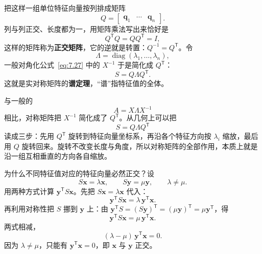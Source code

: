 \documentclass[UTF8,a4paper,12pt]{ctexart}
\numberwithin{equation}{section}
\newcommand{\trans}{^{\mathsf T}}
\begin{document}
	把这样一组单位特征向量按列排成矩阵
	\begin{equation}\label{eq:7.57}
	Q=
	\begin{bmatrix}
		\bm{q}_1&\cdots&\bm{q}_n
	\end{bmatrix}.
	\end{equation}
	列与列正交、长度都为一，用矩阵乘法写出来恰好是
	\begin{equation}\label{eq:7.58}
	Q\trans Q=QQ\trans=I,
	\end{equation}
	这样的矩阵称为\textbf{正交矩阵}，它的逆就是转置：$Q^{-1}=Q\trans$。令
	\begin{equation}\label{eq:7.59}
	\Lambda=\operatorname{diag}(\lambda_1,\ldots,\lambda_n),
	\end{equation}
一般对角化公式~\eqref{eq:7.27} 中的 $X^{-1}$ 于是简化成 $Q\trans$：
	\begin{equation}\label{eq:7.60}
	\boxed{S=Q\Lambda Q\trans.}
	\end{equation}
	这就是实对称矩阵的\textbf{谱定理}，“谱”指特征值的全体。

	与一般的
	\begin{equation}\label{eq:7.61}
	A=X\Lambda X^{-1}
	\end{equation}
	相比，对称矩阵把 $X^{-1}$ 简化成了 $Q\trans$。从几何上可以把
	\begin{equation}\label{eq:7.62}
	S=Q\Lambda Q\trans
	\end{equation}
	读成三步：先用 $Q\trans$ 旋转到特征向量坐标系，再沿各个特征方向按 $\lambda_i$ 缩放，最后用 $Q$ 旋转回来。旋转不改变长度与角度，所以对称矩阵的全部作用，本质上就是沿一组互相垂直的方向各自缩放。

	为什么不同特征值对应的特征向量必然正交？设
	\begin{equation}\label{eq:7.63}
	S\bm{x}=\lambda\bm{x},\qquad S\bm{y}=\mu\bm{y},\qquad \lambda\neq\mu.
	\end{equation}
	用两种方式计算 $\bm{y}\trans S\bm{x}$。先把 $S\bm{x}=\lambda\bm{x}$ 代入：
	\begin{equation}\label{eq:7.64}
	\bm{y}\trans S\bm{x}=\lambda\,\bm{y}\trans\bm{x}.
	\end{equation}
	再利用对称性把 $S$ 挪到 $\bm{y}$ 上：由 $\bm{y}\trans S=(S\bm{y})\trans=(\mu\bm{y})\trans=\mu\bm{y}\trans$，得
	\begin{equation}\label{eq:7.65}
	\bm{y}\trans S\bm{x}=\mu\,\bm{y}\trans\bm{x}.
	\end{equation}
	两式相减，
	\begin{equation}\label{eq:7.66}
	(\lambda-\mu)\,\bm{y}\trans\bm{x}=0.
	\end{equation}
	因为 $\lambda\neq\mu$，只能有 $\bm{y}\trans\bm{x}=0$，即 $\bm{x}$ 与 $\bm{y}$ 正交。
\end{document}
